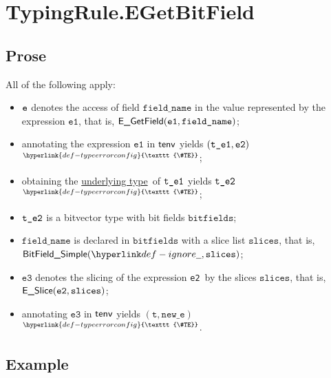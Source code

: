 \documentclass{book}
\newcommand\TypeErrorConfig[0]{\hyperlink{def-typeerrorconfig}{\texttt{\#TE}}}
\newcommand\ProseOrTypeError[0]{\hyperlink{def-proseortypeerror}{$^{\TypeErrorConfig}$}}
\newcommand\underlyingtype[0]{\hyperlink{def-underlyingtype}{underlying type}}
\newcommand\vt[0]{\texttt{t}}
\newcommand\veone[0]{\texttt{e1}}
\newcommand\vetwo[0]{\texttt{e2}}
\newcommand\vethree[0]{\texttt{e3}}
\newcommand\bitfields[0]{\texttt{bitfields}}
\newcommand\fieldname[0]{\texttt{field\_name}}
\newcommand\slices[0]{\texttt{slices}}
\newcommand\newe[0]{\texttt{new\_e}}
\begin{document}


\section{TypingRule.EGetBitField \label{sec:TypingRule.EGetBitField}}

\subsection{Prose}
All of the following apply:
\begin{itemize}
  \item $\texttt{e}$ denotes the access of field $\fieldname$ in the value represented by the expression $\veone$, that is, $\EGetField(\veone, \fieldname)$;
  \item annotating the expression $\veone$ in $\textsf{tenv}$ yields $(\vteone, \vetwo)$ \ProseOrTypeError;
  \item obtaining the \underlyingtype\ of $\texttt{t\_e1}$ yields $\texttt{t\_e2}$ \ProseOrTypeError;
  \item $\texttt{t\_e2}$ is a bitvector type with bit fields $\bitfields$;
  \item $\fieldname$ is declared in $\bitfields$ with a slice list $\slices$, that is, \\ $\BitFieldSimple(\Ignore, \slices)$;
  \item $\vethree$ denotes the slicing of the expression \vetwo\ by the slices $\slices$, that is, \\ $\ESlice(\vetwo, \slices)$;
  \item annotating $\vethree$ in $\textsf{tenv}$ yields $(\vt, \newe)$ \ProseOrTypeError.
\end{itemize}

\subsection{Example}

\end{document}
